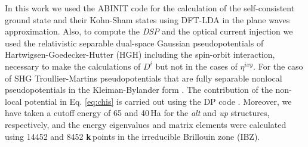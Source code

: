 \documentclass[aps,pra,11pt,tightenlines,showpacs,superscriptaddress,groupedaddress]{revtex4-1}
\newcommand{\ea}{$\eta^{ixy}$}
\begin{document}
In this work we used the ABINIT code \cite{torrent2008implementation} for the calculation of the self-consistent ground state and their Kohn-Sham states using DFT-LDA in the plane waves approximation. Also, to compute the \emph{DSP} and the optical current injection we used the relativistic separable dual-space Gaussian pseudopotentials of Hartwigsen-Goedecker-Hutter (HGH) \cite{hartwigsen1998relativistic} including the spin-orbit interaction, necessary to make the calculations of $D^{i} $ but not in the cases of {\ea}. For the caso of SHG Troullier-Martins pseudopotentials \cite{troullier1991efficient} that are fully separable nonlocal pseudopotentials in the Kleiman-Bylander form \cite{kleinman1982efficacious}. The contribution of the non-local potential in Eq. \ref{eq:chis} is carried out using the DP code \cite{olevanoDP}. Moreover, we have taken a cutoff energy of 65 and 40\,Ha for the \emph{alt} and \emph{up} structures, respectively, and the energy eigenvalues and matrix elements were calculated using 14452 and 8452 \textbf{k}\,points in the irreducible Brillouin zone (IBZ).
\end{document}
